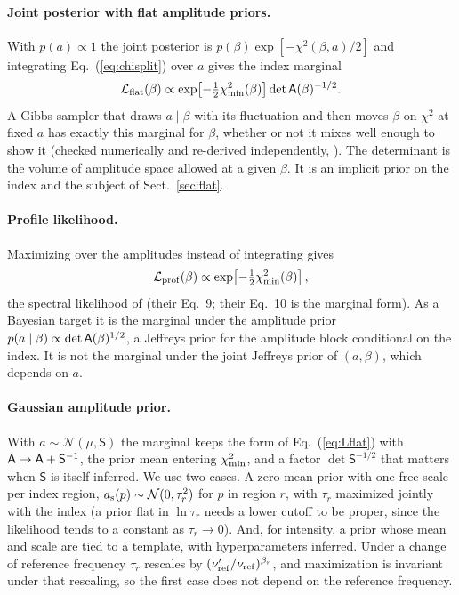 \paragraph{Joint posterior with flat amplitude priors.} With $p(a) \propto 1$ the joint posterior is
$p(\beta)\exp[-\chi^2(\beta,a)/2]$ and integrating Eq.~(\ref{eq:chisplit}) over $a$ gives the index
marginal
\begin{equation}
  \mathcal{L}_{\rm flat}(\beta) \propto \exp\!\left[-\tfrac12 \chi^2_{\min}(\beta)\right] \det \mathsf{A}(\beta)^{-1/2} .
  \label{eq:Lflat}
\end{equation}
A Gibbs sampler that draws $a \mid \beta$ with its fluctuation and then moves $\beta$ on $\chi^2$ at
fixed $a$ has exactly this marginal for $\beta$, whether or not it mixes well enough to show it
(checked numerically and re-derived independently, ). The determinant is the volume
of amplitude space allowed at a given $\beta$. It is an implicit prior on the index and the subject of
Sect.~\ref{sec:flat}.

\paragraph{Profile likelihood.} Maximizing over the amplitudes instead of integrating gives
\begin{equation}
  \mathcal{L}_{\rm prof}(\beta) \propto \exp\!\left[-\tfrac12 \chi^2_{\min}(\beta)\right],
  \label{eq:Lprof}
\end{equation}
the spectral likelihood of \citet{stompor2009} (their Eq.~9; their Eq.~10 is the marginal form).
As a Bayesian target it is the marginal under the amplitude prior
$p(a \mid \beta) \propto \det \mathsf{A}(\beta)^{1/2}$, a Jeffreys prior for the amplitude block conditional on
the index. It is not the marginal under the joint Jeffreys prior of $(a, \beta)$, which depends on $a$.

\paragraph{Gaussian amplitude prior.} With $a \sim \mathcal{N}(\mu, \mathsf{S})$ the marginal keeps the
form of Eq.~(\ref{eq:Lflat}) with $\mathsf{A} \to \mathsf{A} + \mathsf{S}^{-1}$, the prior mean entering $\chi^2_{\min}$, and a
factor $\det\mathsf{S}^{-1/2}$ that matters when $\mathsf{S}$ is itself inferred.
We use two cases. A zero-mean prior with one free scale per index region,
$a_{\rm s}(p) \sim \mathcal{N}(0, \tau_r^2)$ for $p$ in region $r$, with $\tau_r$ maximized jointly with
the index (a prior flat in $\ln\tau_r$ needs a lower cutoff to be proper, since the likelihood tends to a
constant as $\tau_r \to 0$). And, for intensity, a prior whose mean and scale are
tied to a template, with hyperparameters inferred. Under a change of reference frequency $\tau_r$
rescales by $(\nu_{\mathrm{ref}}'/\nu_{\mathrm{ref}})^{\beta_r}$, and maximization is invariant
under that rescaling, so the first case does not depend on the reference frequency.

